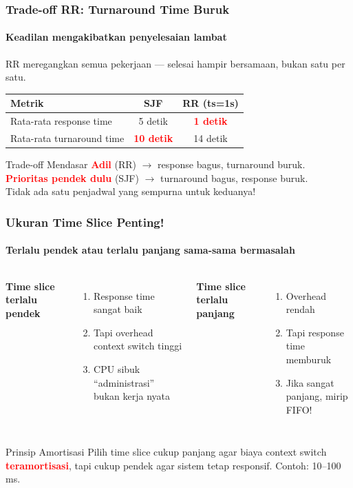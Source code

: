 \documentclass[t,aspectratio=169,xcolor=dvipsnames]{beamer}
\newcommand{\tem}[1]{\textbf{\textcolor{red}{#1}}}
\begin{document}
\begin{frame}
    \frametitle{Trade-off RR: Turnaround Time Buruk}
    \framesubtitle{Keadilan mengakibatkan penyelesaian lambat}
    \small
    RR meregangkan semua pekerjaan --- selesai hampir bersamaan, bukan satu per satu.

    \vspace{0.2cm}
    \begin{tabular}{|p{}|c|c|}
        \hline
        \textbf{Metrik} & \textbf{SJF} & \textbf{RR (ts=1s)} \\
        \hline
        Rata-rata response time & 5 detik & \tem{1 detik} \\
        \hline
        Rata-rata turnaround time & \tem{10 detik} & 14 detik \\
        \hline
    \end{tabular}

    \vspace{0.2cm}
    \begin{alertblock}{Trade-off Mendasar}
        \tem{Adil} (RR) $\rightarrow$ response bagus, turnaround buruk.\\
        \tem{Prioritas pendek dulu} (SJF) $\rightarrow$ turnaround bagus, response buruk.\\
        Tidak ada satu penjadwal yang sempurna untuk keduanya!
    \end{alertblock}
\end{frame}

\begin{frame}
    \frametitle{Ukuran Time Slice Penting!}
    \framesubtitle{Terlalu pendek atau terlalu panjang sama-sama bermasalah}
    \small
    \begin{columns}[T]
        \textbf{Time slice terlalu pendek}
        \begin{enumerate}
            \item Response time sangat baik
            \item Tapi overhead context switch tinggi
            \item CPU sibuk ``administrasi'' bukan kerja nyata
        \end{enumerate}
        \textbf{Time slice terlalu panjang}
        \begin{enumerate}
            \item Overhead rendah
            \item Tapi response time memburuk
            \item Jika sangat panjang, mirip FIFO!
        \end{enumerate}
    \end{columns}
    \begin{block}{Prinsip Amortisasi}
        Pilih time slice cukup panjang agar biaya context switch \tem{teramortisasi}, tapi cukup pendek agar sistem tetap responsif. Contoh: 10--100 ms.
    \end{block}
\end{frame}
\end{document}
